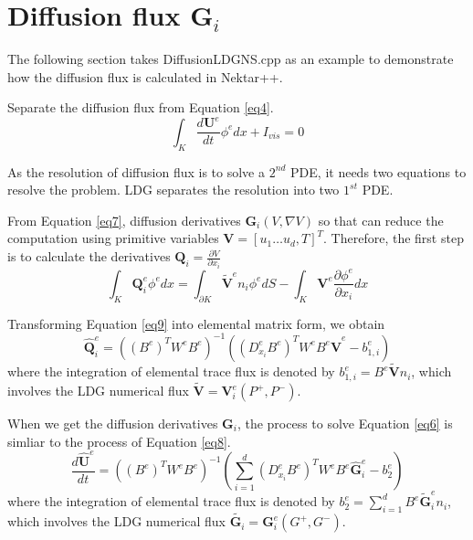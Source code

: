 \section{Diffusion flux $\textbf{G}_{i}$}
The following section takes DiffusionLDGNS.cpp as an example to demonstrate how the diffusion flux is calculated in Nektar++. 

Separate the diffusion flux from Equation \eqref{eq4}.
\begin{equation}\label{eq6}
\int_{K}{\frac{d \textbf{U}^{e}}{d t}\phi^{e} dx}+I_{vis}=0
\end{equation}

As the resolution of diffusion flux is to solve a $2^{nd}$ PDE, it needs two equations to resolve the problem. LDG separates the resolution into two $1^{st}$ PDE.

From Equation \eqref{eq7}, diffusion derivatives $\textbf{G}_{i}(V,\nabla V)$ so that can reduce the computation using primitive variables $\textbf{V}=[u_{1}\hdots u_{d}, T]^{T}$. Therefore, the first step is to calculate the derivatives $\textbf{Q}_{i}=\frac{\partial V}{\partial x_{i}}$
\begin{equation}\label{eq9}
\int_{K}{\textbf{Q}^{e}_{i} \phi^{e} dx}=
{\int_{\partial K}{\widetilde{\textbf{V}}^{e}n_{i}\phi^{e}}dS}-
\int_{K}{\textbf{V}^{e}\frac{\partial \phi^{e}}{\partial x_{i}}dx}
\end{equation}

Transforming Equation \eqref{eq9} into elemental matrix form, we obtain
\begin{equation}\label{eq10}
\hat{\textbf{Q}}_{i}^{e}
=((B^{e})^{T}W^{e}B^{e})^{-1}
((D^{e}_{x_{i}} B^{e})^{T}W^{e}B^{e}\hat{\textbf{V}}^{e}-
b_{1,i}^{e})
\end{equation}
where the integration of elemental trace flux is denoted by $b_{1,i}^{e}=B^{e}\widetilde{\textbf{V}}n_{i}$, which involves the LDG numerical flux $\widetilde{\textbf{V}}=\textbf{V}^{e}_{i}(P^{+},P^{-})$.

When we get the diffusion derivatives $\textbf{G}_{i}$, the process to solve Equation \eqref{eq6} is simliar to the process of Equation \eqref{eq8}.
\begin{equation}\label{eq8}
\frac{d \hat{\textbf{U}}^{e}}{d t}
=((B^{e})^{T}W^{e}B^{e})^{-1}(\sum\limits_{i=1}^{d}{(D^{e}_{x_{i}} B^{e})^{T}}W^{e}B^{e}\hat{\textbf{G}}^{e}_{i}-
b_{2}^{e})
\end{equation}
where the integration of elemental trace flux is denoted by $b_{2}^{e}=\sum\limits_{i=1}^{d}{B^{e}\widetilde{\textbf{G}}^{e}_{i}}n_{i}$, which involves the LDG numerical flux $\widetilde{\textbf{G}_{i}}=\textbf{G}^{e}_{i}(G^{+},G^{-})$.

